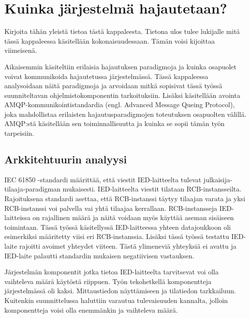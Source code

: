 \chapter{Kuinka järjestelmä hajautetaan?}
\begin{it}
	Kirjoita tähän yleistä tietoa tästä kappaleesta. Tietona ulos tulee lukijalle mitä tässä kappaleessa käsitellään kokonaisuudessaan. Tämän voisi kijoittaa viimeisenä.
\end{it}
Aikaisemmin käsiteltiin erilaisia hajautuksen paradigmoja ja kuinka osapuolet voivat kommunikoida hajautetussa järjestelmässä. Tässä kappaleessa analysoidaan näitä paradigmoja ja arvoidaan mitkä sopisivat tässä työssä suunniteltavan ohjelmistokomponentin tarkoituksiin. Lisäksi käsitellään avointa AMQP-kommunikointistandardia (engl. Advanced Message Queing Protocol), joka mahdollistaa erilaisten hajautusparadigmojen toteutuksen osapuolten välillä. AMQP:stä käsitellään sen toiminnallisuutta ja kuinka se sopii tämän työn tarpeisiin.



\section{Arkkitehtuurin analyysi}
IEC 61850 -standardi määrittää, että viestit IED-laitteelta tulevat julkaisija-tilaaja-paradigman mukaisesti. IED-laitteelta viestit tilataan RCB-instansseilta. Rajoituksena standardi asettaa, että RCB-instanssi täytyy tilaajan varata ja yksi RCB-instanssi voi palvella vai yhtä tilaajaa kerrallaan. RCB-instansseja IED-laitteissa on rajallinen määrä ja näitä voidaan myös käyttää aseman sisäiseen toimintaan. Tässä työssä käsitellyssä IED-laitteessa yhteen datajoukkoon oli esimerkiksi määritetty viisi eri RCB-instanssia. Lisäksi tässä työssä testattu IED-laite rajoitti avoimet yhteydet viiteen. Tästä ylimeneviä yhteyksiä ei avattu ja IED-laite palautti standardin mukaisen negatiivisen vastauksen.

Järjestelmän komponentit jotka tietoa IED-laitteelta tarvitsevat voi olla vaihteleva määrä käytöstä riippuen. Työn tekohetkellä komponentteja järjestelmässä oli kaksi. Mittaustiedon näyttämiseen ja tilatiedon tarkkailuun. Kuitenkin suunnittelussa haluttiin varautua tulevaisuuden kannalta, jolloin komponentteja voisi olla enemmänkin ja vaihteleva määrä.

